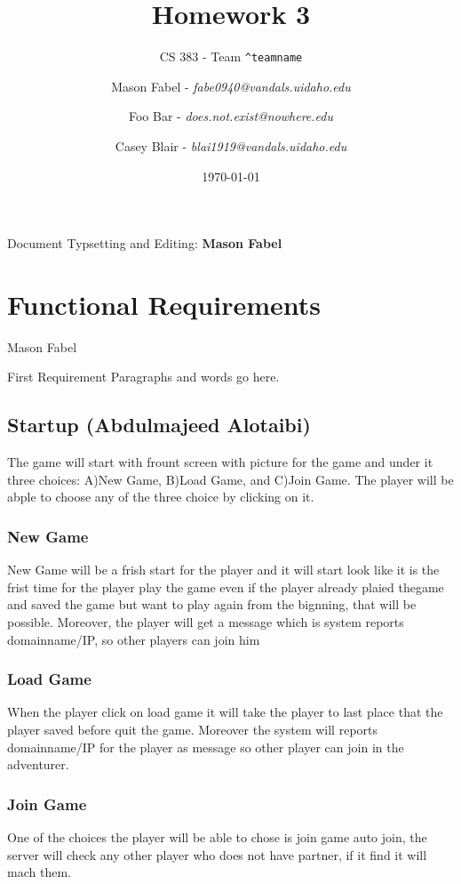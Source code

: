 \documentclass[12pt]{report}
\title{Homework 3}
\subtitle{CS 383 - Team \texttt{\textasciicircum teamname}}
\author{
Mason Fabel - \textit{fabe0940@vandals.uidaho.edu} \\
\and Foo Bar - \textit{does.not.exist@nowhere.edu} \\
\and Casey Blair - \textit{blai1919@vandals.uidaho.edu} \\
}
\date{\today}
\begin{document}
\maketitle

\tableofcontents
Document Typsetting and Editing: \textbf{Mason Fabel}
\clearpage


\chapter{Functional Requirements}

\begin{section}{Mason Fabel}
\begin{subsection}{First Requirement}
Paragraphs and words go here.
  \section{Startup (Abdulmajeed Alotaibi)}

		The game will start with frount screen with picture for the game and under it three choices: A)New Game, B)Load Game, and C)Join Game. The player will be abple to choose any of the three choice by clicking on it.

		\subsection{New Game}
		New Game will be a frish start for the player and it will start look like it is the frist time for the player play the game even if the player already plaied thegame and saved the game but want to play again from the bignning, that will be possible. Moreover, the player will get a message which is system reports domainname/IP, so other players can join him
			

		\subsection{Load Game}
 		When the player click on load game it will take the player to last place that the player saved before quit the game. Moreover the system will reports domainname/IP for the player as message so other player can join in the adventurer.
			
		\subsection{Join Game}
		One of the choices the player will be able to chose is join game auto join, the server will check any other player who does not have partner, if it find it will mach them.


\end{subsection}
\end{section}
\end{document}

